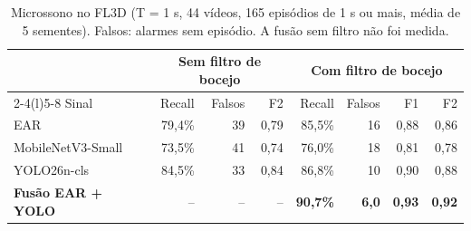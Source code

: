 \documentclass[11pt,a4paper]{article}
\begin{document}
\begin{table}[!t]
\centering\small
\caption{Microssono no FL3D (T = 1 s, 44 vídeos, 165 episódios de 1 s ou mais, média de 5 sementes). Falsos: alarmes sem episódio. A fusão sem filtro não foi medida.}
\label{tab:micro}
\begin{tabular}{@{}lrrrrrrr@{}}
\toprule
 & \multicolumn{3}{c}{Sem filtro de bocejo} & \multicolumn{4}{c}{Com filtro de bocejo}\\
\cmidrule(lr){2-4}\cmidrule(l){5-8}
Sinal & Recall & Falsos & F2 & Recall & Falsos & F1 & F2\\
\midrule
EAR & 79,4\% & 39 & 0,79 & 85,5\% & 16 & 0,88 & 0,86\\
MobileNetV3-Small & 73,5\% & 41 & 0,74 & 76,0\% & 18 & 0,81 & 0,78\\
YOLO26n-cls & 84,5\% & 33 & 0,84 & 86,8\% & 10 & 0,90 & 0,88\\
\textbf{Fusão EAR + YOLO} & -- & -- & -- & \textbf{90,7\%} & \textbf{6,0} & \textbf{0,93} & \textbf{0,92}\\
\bottomrule
\end{tabular}
\end{table}
\end{document}
